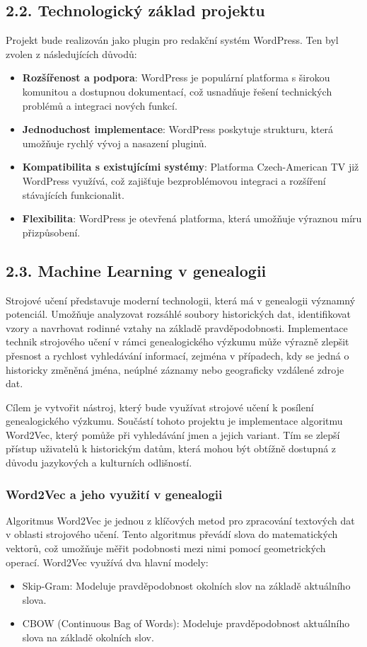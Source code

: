 \documentclass[12pt]{report}
\begin{document}
\subsection{2.2. Technologický základ projektu}
Projekt bude realizován jako plugin pro redakční systém WordPress. Ten byl zvolen z následujících důvodů:
\begin{itemize}
\item \textbf{Rozšířenost a podpora}: WordPress je populární platforma s širokou komunitou a dostupnou dokumentací, což usnadňuje řešení technických problémů a integraci nových funkcí.
\item \textbf{Jednoduchost implementace}: WordPress poskytuje strukturu, která umožňuje rychlý vývoj a nasazení pluginů.
\item \textbf{Kompatibilita s existujícími systémy}: Platforma Czech-American TV již WordPress využívá, což zajišťuje bezproblémovou integraci a rozšíření stávajících funkcionalit.
\item \textbf{Flexibilita}: WordPress je otevřená platforma, která umožňuje výraznou míru přizpůsobení.
\end{itemize}



\subsection{2.3. Machine Learning v genealogii}
Strojové učení představuje moderní technologii, která má v genealogii významný potenciál. Umožňuje analyzovat rozsáhlé soubory historických dat, identifikovat vzory a navrhovat rodinné vztahy na základě pravděpodobnosti. Implementace technik strojového učení v rámci genealogického výzkumu může výrazně zlepšit přesnost a rychlost vyhledávání informací, zejména v případech, kdy se jedná o historicky změněná jména, neúplné záznamy nebo geograficky vzdálené zdroje dat.

Cílem je vytvořit nástroj, který bude využívat strojové učení k posílení genealogického výzkumu. Součástí tohoto projektu je implementace algoritmu Word2Vec, který pomůže při vyhledávání jmen a jejich variant. Tím se zlepší přístup uživatelů k historickým datům, která mohou být obtížně dostupná z důvodu jazykových a kulturních odlišností.

\subsubsection{Word2Vec a jeho využití v genealogii}
Algoritmus Word2Vec je jednou z klíčových metod pro zpracování textových dat v oblasti strojového učení. Tento algoritmus převádí slova do matematických vektorů, což umožňuje měřit podobnosti mezi nimi pomocí geometrických operací. Word2Vec využívá dva hlavní modely:
\begin{itemize}
    \item Skip-Gram: Modeluje pravděpodobnost okolních slov na základě aktuálního slova.
    \item CBOW (Continuous Bag of Words): Modeluje pravděpodobnost aktuálního slova na základě okolních slov.
\end{itemize}
\end{document}
